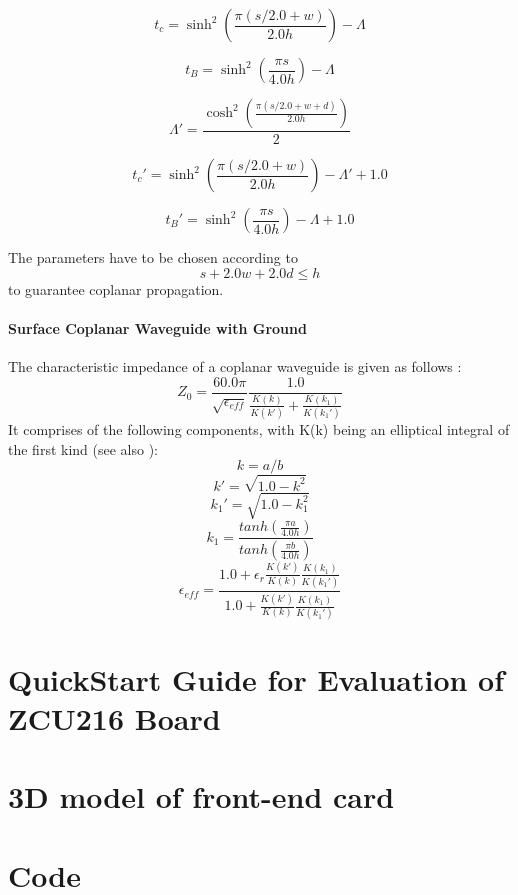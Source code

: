 \begin{equation}
	t_c = \sinh^2 \left( \frac{\pi (s/2.0 + w)}{2.0 h} \right) - \Lambda
\end{equation}

\begin{equation}
	t_B = \sinh^2 \left( \frac{\pi s}{4.0 h} \right) - \Lambda
\end{equation}


\begin{equation}
	\Lambda' = \frac{\cosh^2 \left( \frac{\pi (s/2.0 + w + d)}{2.0 h} \right) }{2}
\end{equation}

\begin{equation}
	t_c' = \sinh^2 \left( \frac{\pi (s/2.0 + w)}{2.0 h} \right) - \Lambda' + 1.0
\end{equation}

\begin{equation}
	t_B' = \sinh^2 \left( \frac{\pi s}{4.0 h} \right) - \Lambda + 1.0
\end{equation}

The parameters have to be chosen according to 
\begin{equation}
	s + 2.0 w + 2.0 d \leq h
\end{equation}
to guarantee coplanar propagation. \cite{wadell}


\paragraph{Surface Coplanar Waveguide with Ground}  
The characteristic impedance of a coplanar waveguide is given as follows \cite{wadell}: 
\begin{equation}
	Z_0 = \frac{60.0 \pi}{\sqrt{\epsilon_{eff}}} \frac{1.0}{\frac{K(k)}{K(k')} + \frac{K(k_1)}{K(k_1')}}
\end{equation}
It comprises of the following components, with K(k) being an elliptical integral of the first kind (see also \cite[p.~430]{bronstein}):
\begin{equation}
	k = a/b
\end{equation}
\begin{equation}
	k' = \sqrt{1.0 - k^{2}}
\end{equation}
\begin{equation}
	k_1' = \sqrt{1.0 - k_1^{2}}
\end{equation}
\begin{equation}
	k_1 = \frac{tanh(\frac{\pi a}{4.0  h})}{tanh(\frac{\pi  b}{4.0 h})}
\end{equation}
\begin{equation}
	\epsilon_{eff} = \frac{1.0 + \epsilon_r \frac{K(k')}{K(k)} \frac{K(k_1)}{K(k_1')}}{1.0 + \frac{K(k')}{K(k)} \frac{K(k_1)}{K(k_1')}}
\end{equation}



\section{QuickStart Guide for Evaluation of ZCU216 Board}
\section{3D model of front-end card}
\section{Code}

